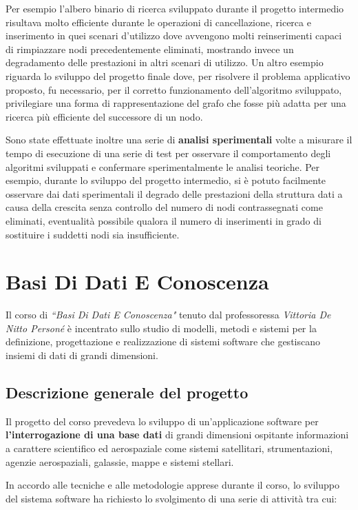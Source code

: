 \documentclass[10pt,a4paper, titlepage]{article}
\begin{document}
Per esempio l'albero binario di ricerca sviluppato durante il progetto intermedio risultava molto efficiente durante le operazioni di cancellazione, ricerca e inserimento in quei scenari d'utilizzo dove avvengono molti reinserimenti capaci di rimpiazzare nodi precedentemente eliminati, mostrando invece un degradamento delle prestazioni in altri scenari di utilizzo. 
Un altro esempio riguarda lo sviluppo del progetto finale dove, per risolvere il problema applicativo proposto, fu necessario, per il corretto funzionamento dell'algoritmo sviluppato, privilegiare una forma di rappresentazione del grafo che fosse più adatta per una ricerca più efficiente del successore di un nodo.

Sono state effettuate inoltre una serie di \textbf{analisi sperimentali} volte a misurare il tempo di esecuzione di una serie di test per osservare il comportamento degli algoritmi sviluppati e confermare sperimentalmente le analisi teoriche. Per esempio, durante lo sviluppo del progetto intermedio, si è potuto facilmente osservare dai dati sperimentali il degrado delle prestazioni della struttura dati a causa della crescita senza controllo del numero di nodi contrassegnati come eliminati, eventualità possibile qualora il numero di inserimenti in grado di sostituire i suddetti nodi sia insufficiente.

\newpage
\section{Basi Di Dati E Conoscenza}

Il corso di \textit{``Basi Di Dati E Conoscenza"} tenuto dal professoressa \textit{Vittoria De Nitto Personé} è incentrato sullo studio di modelli, metodi e sistemi per la definizione, progettazione e realizzazione di sistemi software che gestiscano insiemi di dati di grandi dimensioni.

\subsection{Descrizione generale del progetto}

Il progetto del corso prevedeva lo sviluppo di un'applicazione software per \textbf{l'interrogazione di una base dati} di grandi dimensioni ospitante informazioni a carattere scientifico ed aerospaziale come sistemi satellitari, strumentazioni, agenzie aerospaziali, galassie, mappe e sistemi stellari.

In accordo alle tecniche e alle metodologie apprese durante il corso, lo sviluppo del sistema software ha richiesto lo svolgimento di una serie di attività tra cui:
\end{document}
